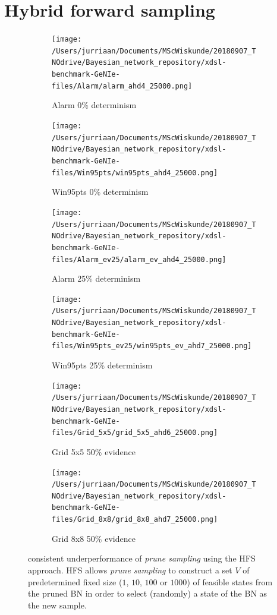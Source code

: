 \documentclass[a4paper, twoside, 11pt]{report}
\theoremstyle{plain}
\theoremstyle{definition}
\theoremstyle{remark}
\newcommand{\ps}{\textit{prune sampling }}
\begin{document}
\section{Hybrid forward sampling}
\begin{figure}[h!]
\centering

\begin{subfigure}{.5\linewidth}
\texttt{[image: /Users/jurriaan/Documents/MScWiskunde/20180907\_TNOdrive/Bayesian\_network\_repository/xdsl-benchmark-GeNIe-files/Alarm/alarm\_ahd4\_25000.png]}
\caption{Alarm 0\% determinism}%
\label{alarm_ev}%
\end{subfigure}\hfill%
\begin{subfigure}{.5\linewidth}
\texttt{[image: /Users/jurriaan/Documents/MScWiskunde/20180907\_TNOdrive/Bayesian\_network\_repository/xdsl-benchmark-GeNIe-files/Win95pts/win95pts\_ahd4\_25000.png]}
\caption{Win95pts 0\% determinism}%
\label{win95pts_ev}%
\end{subfigure}

\begin{subfigure}{.5\linewidth}
\texttt{[image: /Users/jurriaan/Documents/MScWiskunde/20180907\_TNOdrive/Bayesian\_network\_repository/xdsl-benchmark-GeNIe-files/Alarm\_ev25/alarm\_ev\_ahd4\_25000.png]}
\caption{Alarm 25\% determinism}%
\label{grid_3x3}%
\end{subfigure}\hfill%
\begin{subfigure}{.5\linewidth}
\texttt{[image: /Users/jurriaan/Documents/MScWiskunde/20180907\_TNOdrive/Bayesian\_network\_repository/xdsl-benchmark-GeNIe-files/Win95pts\_ev25/win95pts\_ev\_ahd7\_25000.png]}
\caption{Win95pts 25\% determinism}%
\label{grid_5x5}%
\end{subfigure}

\begin{subfigure}{.5\linewidth}
\texttt{[image: /Users/jurriaan/Documents/MScWiskunde/20180907\_TNOdrive/Bayesian\_network\_repository/xdsl-benchmark-GeNIe-files/Grid\_5x5/grid\_5x5\_ahd6\_25000.png]}
\caption{Grid 5x5 50\% evidence}%
\label{grid_3x3}%
\end{subfigure}\hfill%
\begin{subfigure}{.5\linewidth}
\texttt{[image: /Users/jurriaan/Documents/MScWiskunde/20180907\_TNOdrive/Bayesian\_network\_repository/xdsl-benchmark-GeNIe-files/Grid\_8x8/grid\_8x8\_ahd7\_25000.png]}
\caption{Grid 8x8 50\% evidence}%
\label{grid_5x5}%
\end{subfigure}

\vspace{0.75pc}
\caption{consistent underperformance of \ps using the \gls{HFS} approach. HFS allows \ps to construct a set $V$ of predetermined fixed size ($1$, $10$, $100$ or $1000$) of feasible states from the pruned BN in order to select (randomly) a state of the BN as the new sample.}
\label{results5}
\end{figure}
\end{document}
